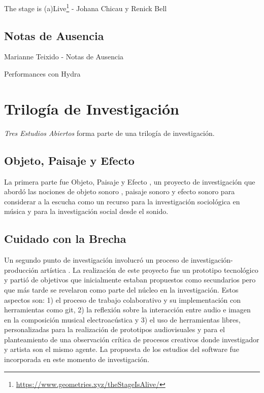 The stage is (a)Live\footnote{\url{https://www.geometries.xyz/theStageIsAlive/}} - Johana Chicau y Renick Bell

\subsection{Notas de Ausencia}

Marianne Teixido - Notas de Ausencia

Performances con Hydra

\section{Trilogía de Investigación}

\textit{Tres Estudios Abiertos} forma parte de una trilogía de investigación.

\subsection{Objeto, Paisaje y Efecto}

La primera parte fue Objeto, Paisaje y Efecto \citep{ocelotlLic}, un proyecto de investigación que abordó las nociones de objeto sonoro \citep{schaeffer}, paisaje sonoro\citep{schafer1} y efecto sonoro \citep{augoyard} para considerar a la escucha como un recurso para la investigación sociológica en música y para la investigación social desde el sonido.

\subsection{Cuidado con la Brecha}

Un segundo punto de investigación involucró un proceso de investigación-producción artística \citep{ocelotlMas}. La realización de este proyecto fue un prototipo tecnológico y partió de objetivos que inicialmente estaban propuestos como secundarios pero que más tarde se revelaron como parte del núcleo en la investigación. Estos aspectos son: 1) el proceso de trabajo colaborativo y su implementación con herramientas como git, 2) la reflexión sobre la interacción entre audio e imagen en la composición musical electroacústica y 3) el uso de herramientas libres, personalizadas para la realización de prototipos audiovisuales y para el planteamiento de una observación crítica de procesos creativos donde investigador y artista son el mismo agente. La propuesta de los estudios del software fue incorporada en este momento de investigación. 

